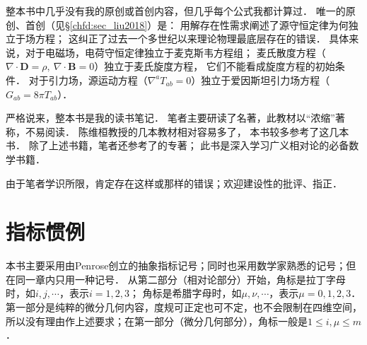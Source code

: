 {\kaishu
    整本书中几乎没有我的原创或首创内容，但几乎每个公式我都计算过．
    唯一的原创、首创\cite{liu2018}（见\S\ref{chfd:sec_liu2018}）是：  
    用解存在性需求阐述了源守恒定律为何独立于场方程；
    这纠正了过去一个多世纪以来理论物理最底层存在的错误．
    具体来说，对于电磁场，电荷守恒定律独立于麦克斯韦方程组；
    麦氏散度方程（$\nabla\cdot \boldsymbol{D}=\rho,\ \nabla \cdot \boldsymbol{B}=0$）独立于麦氏旋度方程，
    它们不能看成旋度方程的初始条件．
    对于引力场，源运动方程（$\nabla^a T_{ab}=0$）独立于爱因斯坦引力场方程（$G_{ab}=8\pi T_{ab}$）．
}


严格说来，整本书是我的读书笔记．
笔者主要研读了\textcite{cc2001-zh}名著，此教材以“浓缩”著称，不易阅读．
陈维桓教授的几本教材\cite{chenwh2001,chen-li-2023-2ed-v1}相对容易多了，  %
本书较多参考了这几本书．
除了上述书籍，笔者还参考了\textcite{oneill1983}的专著；
此书是深入学习广义相对论的必备数学书籍．



由于笔者学识所限，肯定存在这样或那样的错误；欢迎建设性的批评、指正．

%    






\newpage

\section*{指标惯例}
本书主要采用由Penrose创立的抽象指标记号；同时也采用数学家熟悉的记号；但在同一章内只用一种记号．
从{\kaishu 第二部分}（相对论部分）开始，角标是拉丁字母时，如$i,j,\cdots$，表示$i=1,2,3$；
角标是希腊字母时，如$\mu,\nu,\cdots$，表示$\mu=0,1,2,3$．
{\kaishu 第一部分}是纯粹的微分几何内容，度规可正定也可不定，也不会限制在四维空间，
所以没有理由作上述要求；在第一部分（微分几何部分），角标一般是$1\leqslant i, \mu \leqslant m$．


